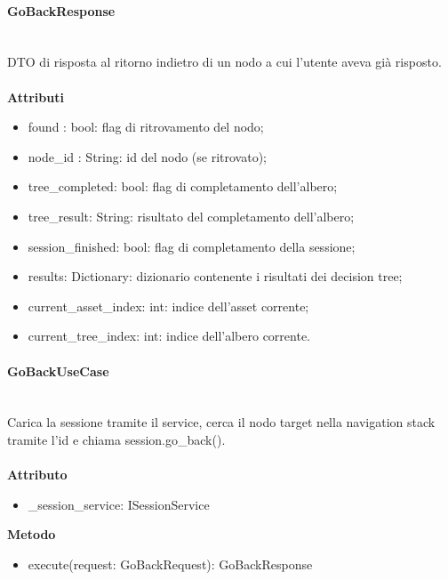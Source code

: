 \documentclass[a4paper,12pt]{article}
\begin{document}
                \paragraph{GoBackResponse}\mbox{}\\
                    DTO di risposta al ritorno indietro di un nodo a cui l'utente aveva già risposto.\\\\
                    \textbf{Attributi}
                    \begin{itemize}
                        \item {\ttfamily found : bool}: flag di ritrovamento del nodo;
                        \item {\ttfamily node\_id : String}: id del nodo (se ritrovato);
                        \item {\ttfamily tree\_completed: bool}: flag di completamento dell'albero;
                        \item {\ttfamily tree\_result: String}: risultato del completamento dell'albero;
                        \item {\ttfamily session\_finished: bool}: flag di completamento della sessione; 
                        \item {\ttfamily results: Dictionary}: dizionario contenente i risultati dei decision tree;
                        \item {\ttfamily current\_asset\_index: int}: indice dell'asset corrente;
                        \item {\ttfamily current\_tree\_index: int}: indice dell'albero corrente.
                    \end{itemize}

                \paragraph{GoBackUseCase}\mbox{}\\
                    Carica la sessione tramite il service, cerca il nodo target nella navigation stack tramite l'id e chiama {\ttfamily session.go\_back()}.\\\\
                    \textbf{Attributo}
                    \begin{itemize}
                        \item {\ttfamily \_session\_service: ISessionService}
                    \end{itemize}
                    \textbf{Metodo}
                    \begin{itemize}
                        \item {\ttfamily execute(request: GoBackRequest): GoBackResponse}
                    \end{itemize}
\end{document}
